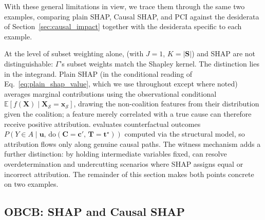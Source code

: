 With these general limitations in view, we trace them through the same two
examples, comparing plain SHAP, Causal SHAP, and PCI against the desiderata of
Section~\ref{sec:causal_impact} together with the desiderata specific to each
example.



\medskip\noindent
At the level of subset weighting alone, \ourapproach{} (with $J=1$, $K=|\mathbf{S}|$) and
SHAP are not distinguishable: $\Gamma$'s subset weights match the Shapley kernel. The
distinction lies in the integrand. Plain SHAP (in the conditional reading of
Eq.~\eqref{eq:plain_shap_value}, which we use throughout except where noted) averages marginal contributions using the observational conditional
$\mathbb{E}[f(\mathbf{X}) \mid \mathbf{X}_{\mathcal{S}} = \mathbf{x}_{\mathcal{S}}]$, drawing the
non-coalition features from their distribution given the coalition; a feature merely
correlated with a true cause can therefore receive positive attribution. \ourapproach{}
evaluates counterfactual
outcomes
$P(Y \in A \mid \mathbf{u},\, \mathrm{do}(\mathbf{C}=\mathbf{c}',\,\mathbf{T}=\mathbf{t}^\star))$
computed via the structural model, so attribution flows only along genuine causal paths.
The witness mechanism adds a further distinction: by holding intermediate variables fixed,
\ourapproach{} can resolve overdetermination and undercutting scenarios where SHAP assigns
equal or incorrect attribution. The remainder of this section makes both points concrete on
two examples.

\subsection{OBCB: SHAP and Causal SHAP}\label{sec:obcb_shap}

